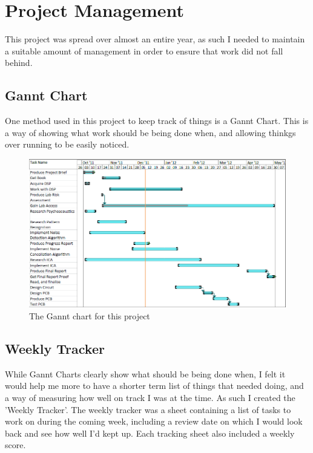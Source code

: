 \section{Project Management}
This project was spread over almost an entire year, as such I needed to maintain a suitable amount of management in order to ensure that work did not fall behind.

\subsection{Gannt Chart}
One method used in this project to keep track of things is a Gannt Chart.
This is a way of showing what work should be being done when, and allowing thinkgs over running to be easily noticed.

\begin{figure}[h]
	\centering
	\includegraphics[width=\textwidth]{./img/gannt.png}
	\caption{The Gannt chart for this project}
	\label{fig:gannt}
\end{figure}

\subsection{Weekly Tracker}
While Gannt Charts clearly show what should be being done when, I felt it would help me more to have a shorter term list of things that needed doing, and a way of measuring how well on track I was at the time. As such I created the 'Weekly Tracker'.
The weekly tracker was a sheet containing a list of tasks to work on during the coming week, including a review date on which I would look back and see how well I'd kept up. Each tracking sheet also included a weekly score.

